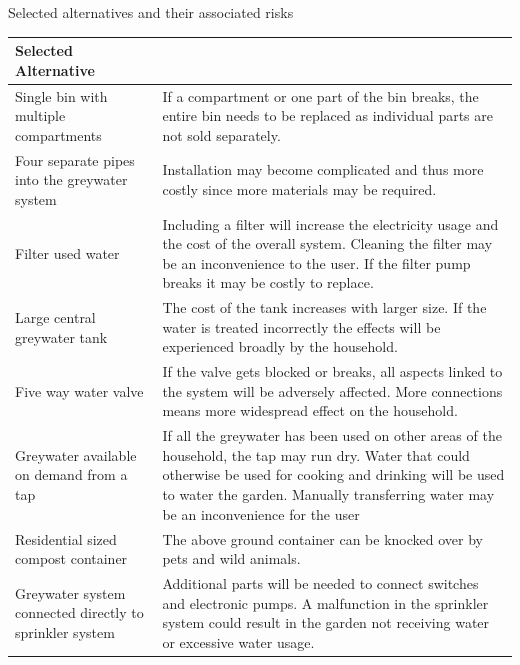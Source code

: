 \documentclass[a4paper,11pt,fleqn]{report}
\begin{document}
\begin{center}
\caption {Selected alternatives and their associated risks}
\begin{longtable}{p{7cm}|p{7cm}}\toprule
	{\textbf{Selected Alternative}} & {\textbf{Associated Risk}\\ \midrule
    \hline
    Single bin with multiple compartments & If a compartment or one part of the bin breaks, the entire bin needs to be replaced as individual parts are not sold separately.\\
        \hline
    Four separate pipes into the greywater system  & Installation may become complicated and thus more costly since more materials may be required.\\
        \hline
    Filter used water & Including a filter will increase the electricity usage and the cost of the overall system. Cleaning the filter may be an inconvenience to the user. If the filter pump breaks it may be costly to replace. \\
        \hline
   Large central greywater tank & The cost of the tank increases with larger size. If the water is treated incorrectly the effects will be experienced broadly by the household. \\
        \hline
    Five way water valve & If the valve gets blocked or breaks, all aspects linked to the system will be adversely affected. More connections means more widespread effect on the household.\\
        \hline
    Greywater available on demand from a tap & If all the greywater has been used on other areas of the household, the tap may run dry. Water that could otherwise be used for cooking and drinking will be used to water the garden. Manually transferring water may be an inconvenience for the user\\
        \hline
    Residential sized compost container & The above ground container can be knocked over by pets and wild animals.\\
        \hline
    Greywater system connected directly to sprinkler system & Additional parts will be needed to connect switches and electronic pumps. A malfunction in the sprinkler system could result in the garden not receiving water or excessive water usage. \\
    \bottomrule
\end{longtable}
\end{center}
%
\end{document}
